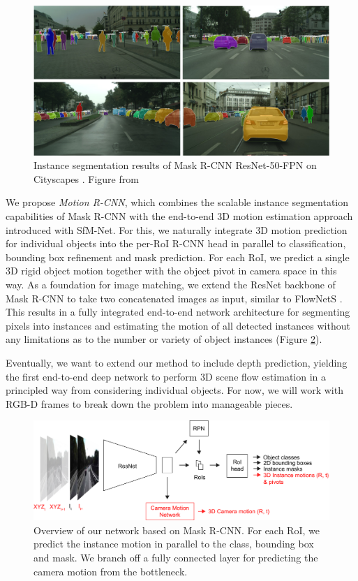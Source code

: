\begin{figure}[t]
  \centering
  \includegraphics[width=\textwidth]{figures/maskrcnn_cs}
\caption{
Instance segmentation results of Mask R-CNN ResNet-50-FPN \cite{MaskRCNN}
on Cityscapes \cite{Cityscapes}. Figure from \cite{MaskRCNN}
}
\label{figure:maskrcnn_cs}
\end{figure}

We propose \emph{Motion R-CNN}, which combines the scalable instance segmentation capabilities of
Mask R-CNN with the end-to-end 3D motion estimation approach introduced with SfM-Net.
For this, we naturally integrate 3D motion prediction for individual objects into the per-RoI R-CNN head
in parallel to classification, bounding box refinement and mask prediction.
For each RoI, we predict a single 3D rigid object motion together with the object
pivot in camera space in this way.
As a foundation for image matching, we extend the ResNet \cite{ResNet} backbone of Mask R-CNN to take
two concatenated images as input, similar to FlowNetS \cite{FlowNet}.
This results in a fully integrated end-to-end network architecture for segmenting pixels into instances
and estimating the motion of all detected instances without any limitations
as to the number or variety of object instances (Figure \ref{figure:net_intro}).

Eventually, we want to extend our method to include depth prediction,
yielding the first end-to-end deep network to perform 3D scene flow estimation
in a principled way from considering individual objects.
For now, we will work with RGB-D frames to break down the problem into
manageable pieces.

\begin{figure}[t]
  \centering
  \includegraphics[width=\textwidth]{figures/net_intro}
\caption{
Overview of our network based on Mask R-CNN. For each RoI, we predict the instance motion
in parallel to the class, bounding box and mask. We branch off a fully connected
layer for predicting the camera motion from the bottleneck.
}
\label{figure:net_intro}
\end{figure}

